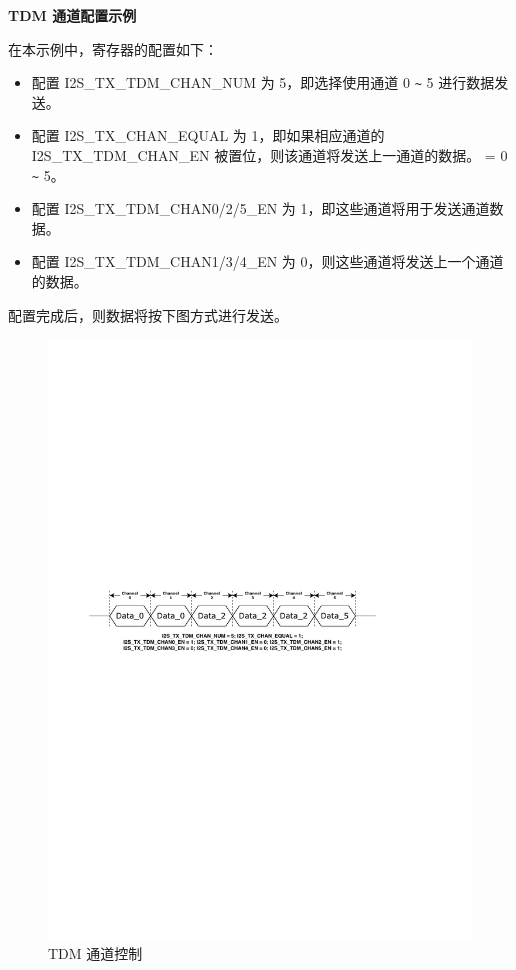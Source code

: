 \documentclass[main\_\_CN.tex]{subfiles}
\begin{document}
\textbf{TDM 通道配置示例}

在本示例中，寄存器的配置如下：

\begin{itemize}
    \item 配置 I2S\_TX\_TDM\_CHAN\_NUM 为 5，即选择使用通道 0 \verb+~+ 5 进行数据发送。
    \item 配置 I2S\_TX\_CHAN\_EQUAL 为 1，即如果相应通道的 I2S\_TX\_TDM\_CHAN\_EN 被置位，则该通道将发送上一通道的数据。 = 0 \verb+~+ 5。
    \item 配置 I2S\_TX\_TDM\_CHAN0/2/5\_EN 为 1，即这些通道将用于发送通道数据。
    \item 配置 I2S\_TX\_TDM\_CHAN1/3/4\_EN 为 0，则这些通道将发送上一个通道的数据。
\end{itemize}

配置完成后，则数据将按下图方式进行发送。

\begin{figure}[H]
    \centering
    \includegraphics[width=1.0\textwidth]{03-I2S/figures/i2s_tdm_channel_config.pdf}
    \caption{TDM 通道控制}
    \label{Figure:i2s_tdm_channel_control}
\end{figure}
\end{document}
